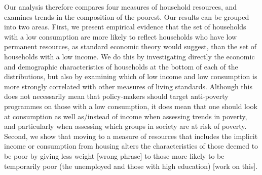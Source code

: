 Our analysis therefore compares four measures of household resources, and examines trends in the composition of the poorest. Our results can be grouped into two areas. First, we present empirical evidence that the set of households with a low consumption are more likely to reflect households who have low permanent resources, as standard economic theory would suggest, than the set of households with a low income.  We do this by investigating directly the economic and demographic characteristics of households at the bottom of each of the distributions, but also by examining which of low income and low consumption is more strongly correlated with other measures of living standards.  Although this does not necessarily mean that policy-makers should target anti-poverty programmes on those with a low consumption, it does mean that one should look at consumption as well as/instead of income when assessing trends in poverty, and particularly when assessing which groups in society are at risk of poverty. Second, we show that moving to a measure of resources that includes the implicit income or consumption from housing alters the characteristics of those deemed to be poor by giving less weight [wrong phrase] to those more likely to be temporarily poor (the unemployed and those with high education) [work on this].



